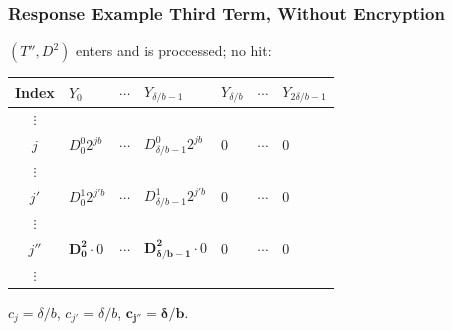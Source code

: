 \documentclass{beamer}
\makeatletter
\DeclareRobustCommand*{\&}{%
  \nfss@text{%
    \fontfamily{LinuxBiolinumT-TLF}%
    \selectfont
    \symbol{`\&}%
  }%
}
\makeatother
\begin{document}
\begin{frame}
  \frametitle{Response Example Third Term, Without Encryption}
  $(T'', D^2)$ enters and is proccessed; no hit:
  \begin{center}
  \begin{tabular}{c  C{1.55cm}  c  C{1.55cm}  C{1.55cm}  c  C{1.55cm}  }
     {\scriptsize Index}             & $Y_0$\qquad            & $\cdots$\qquad         & $Y_{\delta/b-1}$\qquad & $Y_{\delta/b}$\qquad   & $\cdots$\qquad         & $Y_{2\delta/b-1}$\qquad\\\toprule
     $\vdots$ & \\
     {\footnotesize$j$} & {\footnotesize ${D^0_0} 2^{jb}$}                         & $\cdots$                         & {\footnotesize ${D^0_{\delta/b-1}} 2^{jb}$}                      & 0                         & $\cdots$                         & 0                         \\
     $\vdots$ & \\
     {\footnotesize$j'$}  & {\footnotesize ${D^1_0} 2^{j'b}$} & $\cdots$                           & {\footnotesize ${D^1_{\delta/b-1}} 2^{j'b}$}                           & 0                      & $\cdots$                           & 0\\
     $\vdots$ & \\
     {\footnotesize$j''$}  & {\footnotesize $\bm{D^2_0} \cdot 0$}  & $\cdots$                           & {\footnotesize $\bm{D^2_{\delta/b-1}} \cdot 0$}     & 0                      & $\cdots$                           & 0\\
    $\vdots$ & \\\bottomrule
  \end{tabular}
  \end{center}
$c_{j} = \delta/b$, $c_{j'} = \delta/b$, $\bm{c_{j''} = \delta/b}$.
\end{frame}
\end{document}

